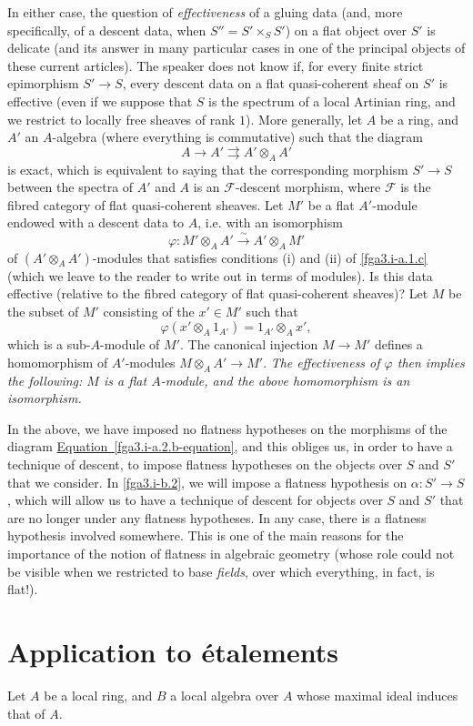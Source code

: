   In either case, the question of \emph{effectiveness} of a gluing data (and, more specifically, of a descent data, when \(S''=S'\times _S S'\)) on a flat object over \(S'\) is delicate (and its answer in many particular cases in one of the principal objects of these current articles).
  The speaker does not know if, for every finite strict epimorphism \(S'\to  S\), every descent data on a flat quasi-coherent sheaf on \(S'\) is effective (even if we suppose that \(S\) is the spectrum of a local Artinian ring, and we restrict to locally free sheaves of rank \(1\)).
  More generally, let \(A\) be a ring, and \(A'\) an \(A\)-algebra (where everything is commutative) such that the diagram
  \[     A \to      A' \rightrightarrows      A'\otimes _A A'   \]
  is exact, which is equivalent to saying that the corresponding morphism \(S'\to  S\) between the spectra of \(A'\) and \(A\) is an \(\mathcal {F}\)-descent morphism, where \(\mathcal {F}\) is the fibred category of flat quasi-coherent sheaves.
  Let \(M'\) be a flat \(A'\)-module endowed with a descent data to \(A\), i.e. with an isomorphism
  \[     \varphi \colon  M'\otimes _A A'     \xrightarrow {\sim } A'\otimes _A M'   \]
  of \((A'\otimes _A A')\)-modules that satisfies conditions (i) and (ii) of \cref{fga3.i-a.1.c} (which we leave to the reader to write out in terms of modules).
  Is this data effective (relative to the fibred category of flat quasi-coherent sheaves)?
  Let \(M\) be the subset of \(M'\) consisting of the \(x'\in  M'\) such that
  \[     \varphi (x'\otimes _A 1_{A'})     = 1_{A'}\otimes _A x',   \]
  which is a sub-\(A\)-module of \(M'\).
  The canonical injection \(M\to  M'\) defines a homomorphism of \(A'\)-modules \(M\otimes _A A'\to  M'\).
  \emph{The effectiveness of \(\varphi \) then implies the following: \(M\) is a flat \(A\)-module, and the above homomorphism is an isomorphism.}\begin{remark}{}\label{fga3.i-a.2.c-remark}\skipsinglepar\par{}In the above, we have imposed no flatness hypotheses on the morphisms of the diagram \hyperref[fga3.i-a.2.b-equation]{Equation~\ref*{fga3.i-a.2.b-equation}}, and this obliges us, in order to have a technique of descent, to impose flatness hypotheses on the objects over \(S\) and \(S'\) that we consider.
    In \cref{fga3.i-b.2}, we will impose a flatness hypothesis on \(\alpha \colon  S'\to  S\), which will allow us to have a technique of descent for objects over \(S\) and \(S'\) that are no longer under any flatness hypotheses.
    In any case, there is a flatness hypothesis involved somewhere.
    This is one of the main reasons for the importance of the notion of flatness in algebraic geometry (whose role could not be visible when we restricted to base \emph{fields}, over which everything, in fact, is flat!).\end{remark}\section{Application to étalements}\label{fga3.i-a.3}\par{}Let \(A\) be a local ring, and \(B\) a local algebra over \(A\) whose maximal ideal induces that of \(A\).
  
